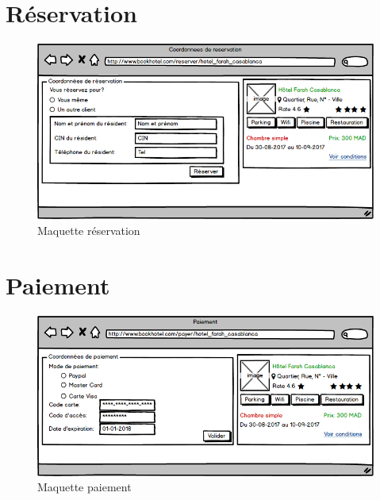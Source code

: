 \documentclass[12pt,a4paper]{report}
\begin{document}
	\section{Réservation}
	\begin{figure}[!hbtp]
		\centering
		\includegraphics[scale=0.5]{./graphics/10.png}
		\caption{Maquette réservation}
	\end{figure}
	
	\section{Paiement}
	\begin{figure}[!hbtp]
		\centering
		\includegraphics[scale=0.5]{./graphics/11.png}
		\caption{Maquette paiement}
	\end{figure}

	\newpage
\end{document}
